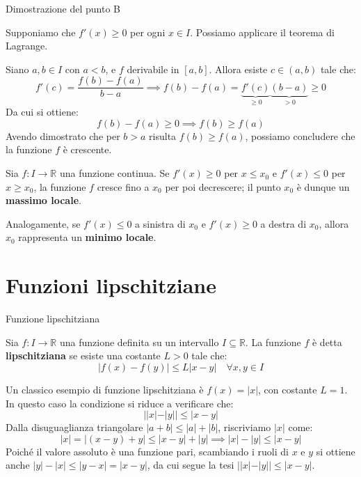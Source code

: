 \documentclass[12pt]{report}
\newcommand{\R}{\mathbb{R}}
\begin{document}
	\begin{dimostrazione}{Dimostrazione del punto B}{}
		
		Supponiamo che $f'(x) \geq 0$ per ogni $x \in I$. Possiamo applicare il teorema di Lagrange.
		
		Siano $a, b \in I$ con $a < b$, e $f$ derivabile in $[a, b]$. Allora esiste $c \in (a, b)$ tale che:
		\[
		f'(c) = \frac{f(b) - f(a)}{b - a} \implies f(b) - f(a) = \underbrace{f'(c)}_{\geq 0} \underbrace{(b - a)}_{> 0} \geq 0
		\]
		Da cui si ottiene:
		\[
		f(b) - f(a) \geq 0 \implies f(b) \geq f(a)
		\]
		Avendo dimostrato che per $b > a$ risulta $f(b) \geq f(a)$, possiamo concludere che la funzione $f$ è crescente.
		
	\end{dimostrazione}
	
	\begin{osservazione}{}{}
		
		Sia $f: I \to \R$ una funzione continua. 
		Se $f'(x) \geq 0$ per $x \leq x_0$ e $f'(x) \leq 0$ per $x \geq x_0$, la funzione $f$ cresce fino a $x_0$ per poi decrescere; il punto $x_0$ è dunque un \textbf{massimo locale}.
		
		Analogamente, se $f'(x) \leq 0$ a sinistra di $x_0$ e $f'(x) \geq 0$ a destra di $x_0$, allora $x_0$ rappresenta un \textbf{minimo locale}.
		
	\end{osservazione}
	
	\section{Funzioni lipschitziane}
	
	\begin{definizione}{Funzione lipschitziana}{}
		
		Sia $f: I \to \R$ una funzione definita su un intervallo $I \subseteq \R$.
		La funzione $f$ è detta \textbf{lipschitziana} se esiste una costante $L > 0$ tale che:
		\[
		|f(x) - f(y)| \leq L |x - y| \quad \forall x, y \in I
		\]
		
	\end{definizione}
	
	Un classico esempio di funzione lipschitziana è $f(x) = |x|$, con costante $L = 1$.
	In questo caso la condizione si riduce a verificare che:
	\[
	||x| - |y|| \leq |x - y|
	\]
	Dalla disuguaglianza triangolare $|a + b| \leq |a| + |b|$, riscriviamo $|x|$ come:
	\[
	|x| = |(x - y) + y| \leq |x - y| + |y| \implies |x| - |y| \leq |x - y|
	\]
	Poiché il valore assoluto è una funzione pari, scambiando i ruoli di $x$ e $y$ si ottiene anche $|y| - |x| \leq |y - x| = |x - y|$, da cui segue la tesi $||x| - |y|| \leq |x - y|$.
	
\end{document}
